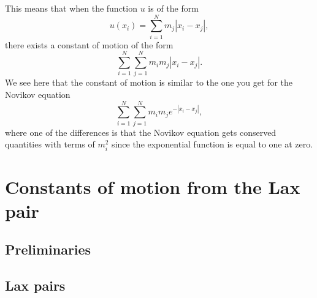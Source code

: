 \documentclass[english,master]{liumaiex}
\theoremstyle{plain}
\theoremstyle{definition}
\begin{document}
This means that when the function $u$ is of the form 
\begin{equation}
	u(x_i) = \sum_{i=1}^{N} m_j |x_i - x_j|,
\end{equation}
there exists a constant of motion of the form
\begin{equation}
	\sum_{i=1}^{N}\sum_{j=1}^N m_i m_j |x_i - x_j|.
\end{equation}
We see here that the constant of motion is similar to the one you get for the Novikov equation
\begin{equation}
	\sum_{i=1}^{N}\sum_{j=1}^N m_i m_j e^{-|x_i - x_j|},
\end{equation}
where one of the differences is that the Novikov equation gets conserved quantities with terms of $m_i^2$ since the exponential function is equal to one at zero.

\section{Constants of motion from the Lax pair} \label{sec:ZeroCurvature}

\subsection{Preliminaries}
\subsection*{Lax pairs}
\end{document}
